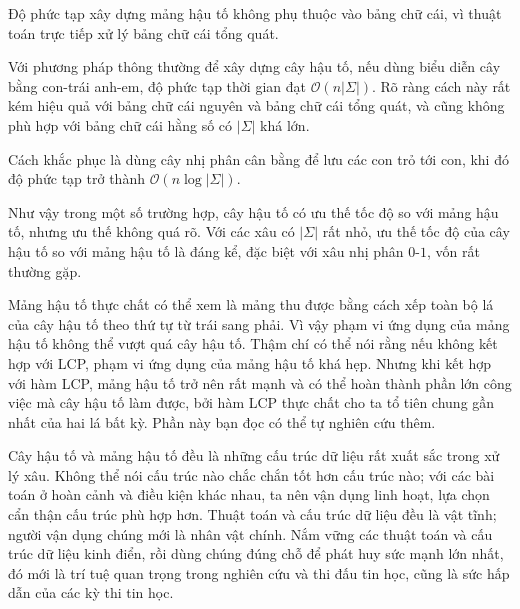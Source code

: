 \documentclass[11pt]{article}
\newcommand{\Oh}{\mathcal{O}}
\begin{document}
Độ phức tạp xây dựng mảng hậu tố không phụ thuộc vào bảng chữ cái, vì thuật
toán trực tiếp xử lý bảng chữ cái tổng quát.

Với phương pháp thông thường để xây dựng cây hậu tố, nếu dùng biểu diễn cây
bằng con-trái anh-em, độ phức tạp thời gian đạt \(\Oh(n|\Sigma|)\). Rõ ràng
cách này rất kém hiệu quả với bảng chữ cái nguyên và bảng chữ cái tổng quát,
và cũng không phù hợp với bảng chữ cái hằng số có \(|\Sigma|\) khá lớn.

Cách khắc phục là dùng cây nhị phân cân bằng để lưu các con trỏ tới con, khi
đó độ phức tạp trở thành \(\Oh(n\log|\Sigma|)\).

Như vậy trong một số trường hợp, cây hậu tố có ưu thế tốc độ so với mảng hậu
tố, nhưng ưu thế không quá rõ. Với các xâu có \(|\Sigma|\) rất nhỏ, ưu thế
tốc độ của cây hậu tố so với mảng hậu tố là đáng kể, đặc biệt với xâu nhị
phân \(0\)-\(1\), vốn rất thường gặp.

Mảng hậu tố thực chất có thể xem là mảng thu được bằng cách xếp toàn bộ lá
của cây hậu tố theo thứ tự từ trái sang phải. Vì vậy phạm vi ứng dụng của
mảng hậu tố không thể vượt quá cây hậu tố. Thậm chí có thể nói rằng nếu
không kết hợp với LCP, phạm vi ứng dụng của mảng hậu tố khá hẹp. Nhưng khi
kết hợp với hàm LCP, mảng hậu tố trở nên rất mạnh và có thể hoàn thành phần
lớn công việc mà cây hậu tố làm được, bởi hàm LCP thực chất cho ta tổ tiên
chung gần nhất của hai lá bất kỳ. Phần này bạn đọc có thể tự nghiên cứu thêm.

Cây hậu tố và mảng hậu tố đều là những cấu trúc dữ liệu rất xuất sắc trong xử
lý xâu. Không thể nói cấu trúc nào chắc chắn tốt hơn cấu trúc nào; với các
bài toán ở hoàn cảnh và điều kiện khác nhau, ta nên vận dụng linh hoạt, lựa
chọn cẩn thận cấu trúc phù hợp hơn. Thuật toán và cấu trúc dữ liệu đều là vật
tĩnh; người vận dụng chúng mới là nhân vật chính. Nắm vững các thuật toán và
cấu trúc dữ liệu kinh điển, rồi dùng chúng đúng chỗ để phát huy sức mạnh lớn
nhất, đó mới là trí tuệ quan trọng trong nghiên cứu và thi đấu tin học, cũng
là sức hấp dẫn của các kỳ thi tin học.
\end{document}
